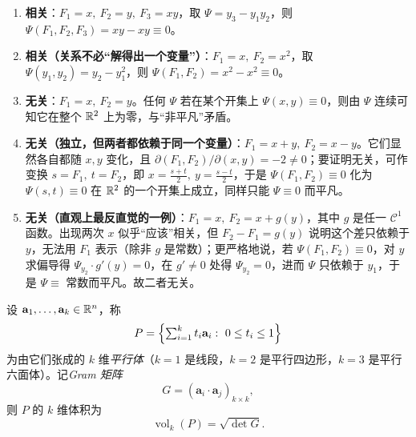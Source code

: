 \begin{example}[典型的函数相关与无关]
\begin{enumerate}[label=(\arabic*)]
  \item \textbf{相关}：\(F_1=x,\ F_2=y,\ F_3=xy\)，取 \(\Psi=y_3-y_1y_2\)，则 \(\Psi(F_1,F_2,F_3)=xy-xy\equiv0\)。
  \item \textbf{相关（关系不必“解得出一个变量”）}：\(F_1=x,\ F_2=x^2\)，取 \(\Psi(y_1,y_2)=y_2-y_1^2\)，则 \(\Psi(F_1,F_2)=x^2-x^2\equiv0\)。
  \item \textbf{无关}：\(F_1=x,\ F_2=y\)。任何 \(\Psi\) 若在某个开集上 \(\Psi(x,y)\equiv0\)，则由 \(\Psi\) 连续可知它在整个 \(\mathbb{R}^2\) 上为零，与“非平凡”矛盾。
  \item \textbf{无关（独立，但两者都依赖于同一个变量）}：\(F_1=x+y,\ F_2=x-y\)。它们显然各自都随 \(x,y\) 变化，且 \(\partial(F_1,F_2)/\partial(x,y)=-2\ne0\)；要证明无关，可作变换 \(s=F_1,\ t=F_2\)，即 \(x=\frac{s+t}2,\ y=\frac{s-t}2\)，于是 \(\Psi(F_1,F_2)\equiv0\) 化为 \(\Psi(s,t)\equiv0\) 在 \(\mathbb{R}^2\) 的一个开集上成立，同样只能 \(\Psi\equiv0\) 而平凡。
  \item \textbf{无关（直观上最反直觉的一例）}：\(F_1=x,\ F_2=x+g(y)\)，其中 \(g\) 是任一 \(\mathcal C^1\) 函数。出现两次 \(x\) 似乎“应该”相关，但 \(F_2-F_1=g(y)\) 说明这个差只依赖于 \(y\)，无法用 \(F_1\) 表示（除非 \(g\) 是常数）；更严格地说，若 \(\Psi(F_1,F_2)\equiv0\)，对 \(y\) 求偏导得 \(\Psi_{y_2}\cdot g'(y)=0\)，在 \(g'\ne0\) 处得 \(\Psi_{y_2}=0\)，进而 \(\Psi\) 只依赖于 \(y_1\)，于是 \(\Psi\equiv\) 常数而平凡。故二者无关。
\end{enumerate}
\end{example}

\begin{lemma}
设 \(\mathbf{a}_1,\dots,\mathbf{a}_k\in\mathbb{R}^n\)，称
\[
P=\Bigl\{\textstyle\sum_{i=1}^{k}t_i\mathbf{a}_i:\ 0\le t_i\le1\Bigr\}
\]
为由它们张成的 \(k\) 维\emph{平行体}（\(k=1\) 是线段，\(k=2\) 是平行四边形，\(k=3\) 是平行六面体）。记\emph{Gram 矩阵}
\[
G=(\mathbf{a}_i\cdot\mathbf{a}_j)_{k\times k},
\]
则 \(P\) 的 \(k\) 维体积为
\[
\operatorname{vol}_k(P)=\sqrt{\det G}.
\]
\end{lemma}

